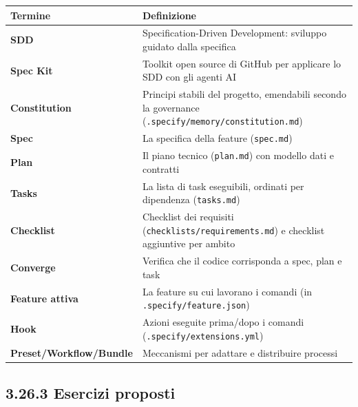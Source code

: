 \documentclass[
  italian,
  10pt,
]{book}
\newcounter{none} %
\begin{document}
{\def\LTcaptype{none} %
\begin{longtable}[]{@{}
  >{\raggedright\arraybackslash}p{}
  >{\raggedright\arraybackslash}p{}@{}}
\toprule\noalign{}
\begin{minipage}[b]{\linewidth}\raggedright
Termine
\end{minipage} & \begin{minipage}[b]{\linewidth}\raggedright
Definizione
\end{minipage} \\
\midrule\noalign{}
\endhead
\bottomrule\noalign{}
\endlastfoot
\textbf{SDD} & Specification-Driven Development: sviluppo guidato dalla
specifica \\
\textbf{Spec Kit} & Toolkit open source di GitHub per applicare lo SDD
con gli agenti AI \\
\textbf{Constitution} & Principi stabili del progetto, emendabili
secondo la governance (\texttt{.specify/memory/constitution.md}) \\
\textbf{Spec} & La specifica della feature (\texttt{spec.md}) \\
\textbf{Plan} & Il piano tecnico (\texttt{plan.md}) con modello dati e
contratti \\
\textbf{Tasks} & La lista di task eseguibili, ordinati per dipendenza
(\texttt{tasks.md}) \\
\textbf{Checklist} & Checklist dei requisiti
(\texttt{checklists/requirements.md}) e checklist aggiuntive per
ambito \\
\textbf{Converge} & Verifica che il codice corrisponda a spec, plan e
task \\
\textbf{Feature attiva} & La feature su cui lavorano i comandi (in
\texttt{.specify/feature.json}) \\
\textbf{Hook} & Azioni eseguite prima/dopo i comandi
(\texttt{.specify/extensions.yml}) \\
\textbf{Preset/Workflow/Bundle} & Meccanismi per adattare e distribuire
processi \\
\end{longtable}
}

\subsection{3.26.3 Esercizi proposti}\label{esercizi-proposti-2}
\end{document}
